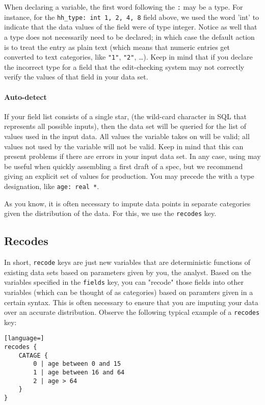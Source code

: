 \documentclass{article}
\begin{document}
When declaring a variable, the first word following the {\tt :} may be a type. For instance, 
for the {\tt hh\_type: int 1, 2, 4, 8} field above, we used the word 'int' to indicate that 
the data values of the field were of type integer. Notice as well that a type does not necessarily 
need to be declared; in which case the default action is to treat the entry as plain text (which means
that numeric entries get converted to text categories, like {\tt "1"}, {\tt "2"}, \dots). Keep in mind 
that if you declare the incorrect type for a field that the edit-checking system may not correctly 
verify the values of that field in your data set.

\paragraph{Auto-detect} If your field list consists of a single star, {\tt *} (the wild-card character 
in SQL that represents all possible inputs), then the data set will be queried for the list of values 
used in the input data. All values the variable takes on will be valid; all values not used 
by the variable will not be valid. Keep in mind that this can present problems if there are errors 
in your input data set.
In any case, using {\tt *} may be useful when quickly assembling a first draft of a spec, but we recommend
giving an explicit set of values for production. You may precede the {\tt *}
with a type designation, like {\tt age: real *}.


As you know, it is often necessary to impute data points in separate categories given 
the distribution of the data. For this, we use the {\tt recodes} key.

\subsection{Recodes}
In short, {\tt recode} keys are just new variables that are deterministic functions of 
existing data sets based on parameters given by you, the analyst. Based on the variables specified in the 
{\tt fields} key, you can "recode" those fields into other variables (which can be thought of as categories) 
based on paramters given in a certain syntax. This is often necessary to ensure that you are imputing 
your data over an accurate distribution. Observe the following typical example of a {\tt recodes} key:

\begin{lstlisting}[language=]
recodes {
    CATAGE {
        0 | age between 0 and 15
        1 | age between 16 and 64
        2 | age > 64
    }
}
\end{lstlisting}
\end{document}
